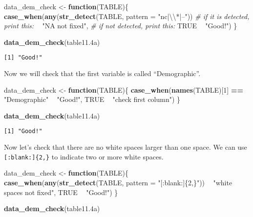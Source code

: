 \documentclass[
]{article}
\newenvironment{Shaded}{\begin{snugshade}}{\end{snugshade}}
\newcommand{\CharTok}[1]{\textcolor[rgb]{0.31,0.60,0.02}{#1}}
\newcommand{\CommentTok}[1]{\textcolor[rgb]{0.56,0.35,0.01}{\textit{#1}}}
\newcommand{\ControlFlowTok}[1]{\textcolor[rgb]{0.13,0.29,0.53}{\textbf{#1}}}
\newcommand{\DataTypeTok}[1]{\textcolor[rgb]{0.13,0.29,0.53}{#1}}
\newcommand{\DecValTok}[1]{\textcolor[rgb]{0.00,0.00,0.81}{#1}}
\newcommand{\FloatTok}[1]{\textcolor[rgb]{0.00,0.00,0.81}{#1}}
\newcommand{\KeywordTok}[1]{\textcolor[rgb]{0.13,0.29,0.53}{\textbf{#1}}}
\newcommand{\NormalTok}[1]{#1}
\newcommand{\OperatorTok}[1]{\textcolor[rgb]{0.81,0.36,0.00}{\textbf{#1}}}
\newcommand{\OtherTok}[1]{\textcolor[rgb]{0.56,0.35,0.01}{#1}}
\newcommand{\StringTok}[1]{\textcolor[rgb]{0.31,0.60,0.02}{#1}}
\begin{document}
\begin{Shaded}
\begin{Highlighting}[]
\NormalTok{data_dem_check <-}\StringTok{ }\ControlFlowTok{function}\NormalTok{(TABLE)\{}
  \KeywordTok{case_when}\NormalTok{(}\KeywordTok{any}\NormalTok{(}\KeywordTok{str_detect}\NormalTok{(TABLE, }\DataTypeTok{pattern =} \StringTok{"nc|}\CharTok{\textbackslash{}\textbackslash{}}\StringTok{*|--"}\NormalTok{)) }
  \CommentTok{# if it is detected, print this:}
         \OperatorTok{~}\StringTok{ "NA not fixed"}\NormalTok{,}
  \CommentTok{# if not detected, print this:}
    \OtherTok{TRUE} \OperatorTok{~}\StringTok{ "Good!"}\NormalTok{)}
\NormalTok{\}}


\KeywordTok{data_dem_check}\NormalTok{(table11}\FloatTok{.4}\NormalTok{a)}
\end{Highlighting}
\end{Shaded}

\begin{verbatim}
[1] "Good!"
\end{verbatim}

Now we will check that the first variable is called ``Demographic''.

\begin{Shaded}
\begin{Highlighting}[]
\NormalTok{data_dem_check <-}\StringTok{ }\ControlFlowTok{function}\NormalTok{(TABLE)\{}
  \KeywordTok{case_when}\NormalTok{(}\KeywordTok{names}\NormalTok{(TABLE)[}\DecValTok{1}\NormalTok{] }\OperatorTok{==}\StringTok{ "Demographic"} \OperatorTok{~}\StringTok{ "Good!"}\NormalTok{,}
                                        \OtherTok{TRUE} \OperatorTok{~}\StringTok{ "check first column"}\NormalTok{)}
\NormalTok{  \}}

\KeywordTok{data_dem_check}\NormalTok{(table11}\FloatTok{.4}\NormalTok{a)}
\end{Highlighting}
\end{Shaded}

\begin{verbatim}
[1] "Good!"
\end{verbatim}

Now let's check that there are no white spaces larger than one space. We
can use \texttt{{[}:blank:{]}\{2,\}} to indicate two or more white
spaces.

\begin{Shaded}
\begin{Highlighting}[]
\NormalTok{data_dem_check <-}\StringTok{ }\ControlFlowTok{function}\NormalTok{(TABLE)\{}
  \KeywordTok{case_when}\NormalTok{(}\KeywordTok{any}\NormalTok{(}\KeywordTok{str_detect}\NormalTok{(TABLE, }\DataTypeTok{pattern =} \StringTok{"[:blank:]\{2,\}"}\NormalTok{)) }
         \OperatorTok{~}\StringTok{ "white spaces not fixed"}\NormalTok{,}
    \OtherTok{TRUE} \OperatorTok{~}\StringTok{ "Good!"}\NormalTok{)}
\NormalTok{\}}


\KeywordTok{data_dem_check}\NormalTok{(table11}\FloatTok{.4}\NormalTok{a)}
\end{Highlighting}
\end{Shaded}
\end{document}
